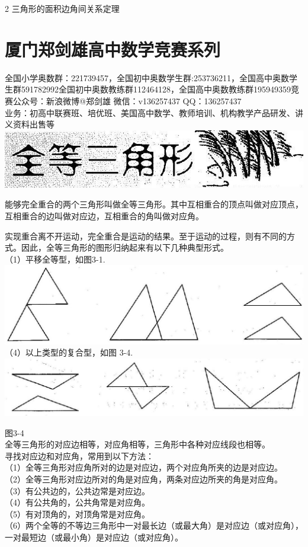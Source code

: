 \documentclass[10pt]{article}
\begin{document}
2 三角形的面积边角间关系定理

\section*{厦门郑剑雄高中数学竞赛系列}
全国小学奥数群：221739457，全国初中奥数学生群:253736211，全国高中奥数学生群591782992全国初中奥数教练群112464128，全国高中奥数教练群195949359竞赛公众号：新浪微博@郑剑雄 微信：v136257437 QQ：136257437\\
业务：初高中联赛班、培优班、美国高中数学、教师培训、机构教学产品研发、讲义资料出售等\\
\includegraphics[max width=\textwidth, center]{2024_10_30_2c8f45efd4a519b08e1ag-024}

能够完全重合的两个三角形叫做全等三角形。其中互相重合的顶点叫做对应顶点，互相重合的边叫做对应边，互相重合的角叫做对应角。

实现重合离不开运动，完全重合是运动的结果。至于运动的过程，则有不同的方式。因此，全等三角形的图形归纳起来有以下几种典型形式。\\
（1）平移全等型，如图3-1.\\
\includegraphics[max width=\textwidth, center]{2024_10_30_2c8f45efd4a519b08e1ag-024(1)}\\
（4）以上类型的复合型，如图 3-4.\\
\includegraphics[max width=\textwidth, center]{2024_10_30_2c8f45efd4a519b08e1ag-025}

图3-4\\
全等三角形的对应边相等，对应角相等，三角形中各种对应线段也相等。\\
寻找对应边和对应角，常用到以下方法：\\
（1）全等三角形对应角所对的边是对应边，两个对应角所夹的边是对应边。\\
（2）全等三角形对应边所对的角是对应角，两条对应边所夹的角是对应角。\\
（3）有公共边的，公共边常是对应边。\\
（4）有公共角的，公共角常是对应角。\\
（5）有对顶角的，对顶角常是对应角。\\
（6）两个全等的不等边三角形中一对最长边（或最大角）是对应边（或对应角），一对最短边（或最小角）是对应边（或对应角）。
\end{document}

